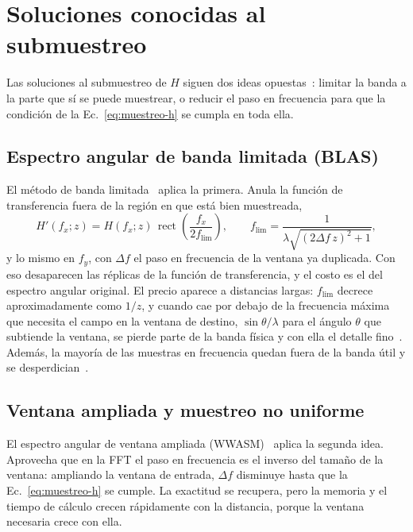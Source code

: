 \section{Soluciones conocidas al submuestreo}
\label{sec:soluciones}

Las soluciones al submuestreo de $H$ siguen dos ideas
opuestas~\cite{zhao2020}: limitar la banda a la parte que sí se puede
muestrear, o reducir el paso en frecuencia para que la condición de la
Ec.~\eqref{eq:muestreo-h} se cumpla en toda ella.

\subsection{Espectro angular de banda limitada (BLAS)}

El método de banda limitada~\cite{matsushima2009} aplica la primera. Anula la
función de transferencia fuera de la región en que está bien muestreada,
\begin{equation}
  H'(f_x; z) = H(f_x; z)\,\operatorname{rect}\!\left(\frac{f_x}{2f_\mathrm{lim}}\right),
  \qquad
  f_\mathrm{lim} = \frac{1}{\lambda\sqrt{(2\Delta f\,z)^2 + 1}},
  \label{eq:blas}
\end{equation}
y lo mismo en $f_y$, con $\Delta f$ el paso en frecuencia de la ventana ya
duplicada. Con eso desaparecen las réplicas de la función de transferencia, y
el costo es el del espectro angular original. El precio aparece a distancias
largas: $f_\mathrm{lim}$ decrece aproximadamente como $1/z$, y cuando cae por
debajo de la frecuencia máxima que necesita el campo en la ventana de
destino, $\sin\theta/\lambda$ para el ángulo $\theta$ que subtiende la
ventana, se pierde parte de la banda física y con ella el detalle
fino~\cite{matsushima2009}. Además, la mayoría de las muestras en frecuencia
quedan fuera de la banda útil y se desperdician~\cite{zhao2020}.

\subsection{Ventana ampliada y muestreo no uniforme}

El espectro angular de ventana ampliada (WWASM)~\cite{yu2012} aplica la
segunda idea. Aprovecha que en la FFT el paso en frecuencia es el inverso del
tamaño de la ventana: ampliando la ventana de entrada, $\Delta f$ disminuye
hasta que la Ec.~\eqref{eq:muestreo-h} se cumple. La exactitud se recupera,
pero la memoria y el tiempo de cálculo crecen rápidamente con la distancia,
porque la ventana necesaria crece con ella.

